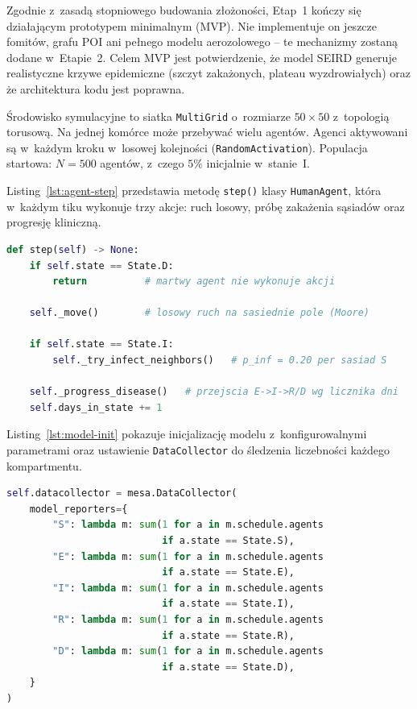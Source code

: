 \documentclass[polish]{projectreport}
\begin{document}
Zgodnie z~zasadą stopniowego budowania złożoności, Etap~1 kończy się działającym
prototypem minimalnym (MVP). Nie implementuje on jeszcze fomitów, grafu POI ani
pełnego modelu aerozolowego -- te mechanizmy zostaną dodane w~Etapie~2. Celem MVP
jest potwierdzenie, że model SEIRD generuje realistyczne krzywe epidemiczne
(szczyt zakażonych, plateau wyzdrowiałych) oraz że architektura kodu jest poprawna.

Środowisko symulacyjne to siatka \texttt{MultiGrid} o~rozmiarze $50 \times 50$
z~topologią torusową. Na jednej komórce może przebywać wielu agentów. Agenci
aktywowani są w~każdym kroku w~losowej kolejności (\texttt{RandomActivation}).
Populacja startowa: $N = 500$ agentów, z~czego $5\%$ inicjalnie w~stanie~I.

Listing~\ref{lst:agent-step} przedstawia metodę \texttt{step()} klasy
\texttt{HumanAgent}, która w~każdym tiku wykonuje trzy akcje: ruch losowy,
próbę zakażenia sąsiadów oraz progresję kliniczną.

\begin{lstlisting}[language=Python, caption={Metoda \texttt{step()} klasy
  \texttt{HumanAgent} -- rdzeń logiki agenta}, label=lst:agent-step]
def step(self) -> None:
    if self.state == State.D:
        return          # martwy agent nie wykonuje akcji

    self._move()        # losowy ruch na sasiednie pole (Moore)

    if self.state == State.I:
        self._try_infect_neighbors()   # p_inf = 0.20 per sasiad S

    self._progress_disease()   # przejscia E->I->R/D wg licznika dni
    self.days_in_state += 1
\end{lstlisting}

Listing~\ref{lst:model-init} pokazuje inicjalizację modelu z~konfigurowalnymi
parametrami oraz ustawienie \texttt{DataCollector} do śledzenia liczebności
każdego kompartmentu.

\begin{lstlisting}[language=Python, caption={Inicjalizacja \texttt{EpidemicModel}
  i konfiguracja \texttt{DataCollector}}, label=lst:model-init]
self.datacollector = mesa.DataCollector(
    model_reporters={
        "S": lambda m: sum(1 for a in m.schedule.agents
                           if a.state == State.S),
        "E": lambda m: sum(1 for a in m.schedule.agents
                           if a.state == State.E),
        "I": lambda m: sum(1 for a in m.schedule.agents
                           if a.state == State.I),
        "R": lambda m: sum(1 for a in m.schedule.agents
                           if a.state == State.R),
        "D": lambda m: sum(1 for a in m.schedule.agents
                           if a.state == State.D),
    }
)
\end{lstlisting}
\end{document}
